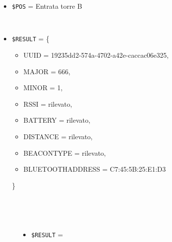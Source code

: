 \documentclass[../../Sperimentazione.tex]{subfiles}
\begin{document}
	
	\newpage
			\paragraph*{}		
			\label{Prova9A.1}
			\begin{tcolorbox}[fonttitle=\bfseries, 
								adjusted title={\Large Prova 9A.1}, 
								breakable, 
								sharp corners=south,
								colback=white, 
								colframe=white!60!black]
								
				\begin{description}[leftmargin=0.7cm,labelwidth=!]
				
					\item[Input] \ \par 
        				\begin{itemize}
        					\item \verb|$POS| = Entrata torre B
        				\end{itemize}
        				
        			\tcbline 
        				
        			\item[Output atteso] \ \par
        				\begin{itemize}
        					\item \verb|$RESULT| = \{
        					\begin{itemize}[label={}]
        						\item UUID = 19235dd2-574a-4702-a42e-caccac06e325,
								\item MAJOR = 666,
								\item MINOR = 1,
								\item RSSI = rilevato,
								\item BATTERY = rilevato,
								\item DISTANCE = rilevato,
								\item BEACONTYPE = rilevato,
								\item BLUETOOTHADDRESS = C7:45:5B:25:E1:D3
        					\end{itemize}
        					\}
        				\end{itemize}

					\tcbline        				
        				
        			\item[Output riscontrato] \ \par
        				\begin{description}
        				
        					\item[\dispositivoA] \ \par
        					\begin{itemize}
        						\item \verb|$RESULT| = \ok
        					\end{itemize}      					
        					

\end{description}
\end{description}
\end{tcolorbox}
\end{document}
